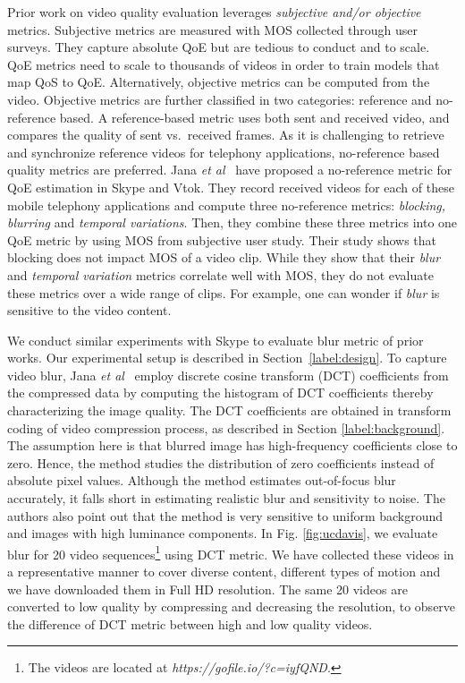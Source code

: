 Prior work on video quality evaluation leverages \emph{subjective and/or objective} metrics. Subjective metrics are measured with MOS collected through user surveys. They capture absolute QoE but are tedious to conduct and to scale. QoE metrics need to scale to thousands of videos in order to train models that map QoS to QoE. Alternatively, objective metrics can be computed from the video. Objective metrics are further classified in two categories: reference and no-reference based. A reference-based metric uses both sent and received video, and compares the quality of sent vs.~received frames. As it is challenging to retrieve and synchronize reference videos for telephony applications, no-reference based quality metrics are preferred. Jana {\em et al}~\cite{jana2016qoe} have proposed a no-reference metric for QoE estimation in Skype and Vtok. They record received videos for each of these mobile telephony applications and compute three no-reference metrics: {\em blocking, blurring} and {\em temporal variations}. Then, they combine these three metrics into one QoE metric by using MOS from subjective user study. Their study shows that blocking does not impact MOS of a video clip. While they show that their {\em blur} and {\em temporal variation} metrics correlate well with MOS, they do not evaluate these metrics over a wide range of clips. For example, one can wonder if {\em blur} is sensitive to the video content. 

We conduct similar experiments with Skype to evaluate blur metric of prior works. 
Our experimental setup is described in Section~\ref{label:design}. 
To capture video blur, Jana {\em et al}~\cite{jana2016qoe}  employ discrete cosine transform (DCT) coefficients \cite{marichal1999blur} from the compressed data by computing the histogram of DCT coefficients thereby characterizing the image quality. 
The DCT coefficients are obtained in transform coding of video compression process, as described in Section \ref{label:background}. 
The assumption here is that blurred image has high-frequency coefficients close to zero. 
Hence, the method studies the distribution of zero coefficients instead of absolute pixel values. 
Although the method estimates out-of-focus blur accurately, it falls short in estimating realistic blur and sensitivity to noise. 
The authors also point out that the method is very sensitive to uniform background and images with high luminance components. 
In Fig. \ref{fig:ucdavis}, we evaluate blur for 20 video sequences\footnote{\scriptsize{The videos are located at \textit{https://gofile.io/?c=iyfQND}.}} using DCT metric. 
We have collected these videos in a representative manner to cover diverse content, different types of motion and we have downloaded them in Full HD resolution. 
The same 20 videos are converted to low quality by compressing and decreasing the resolution, to observe the difference of DCT metric between high and low quality videos.

